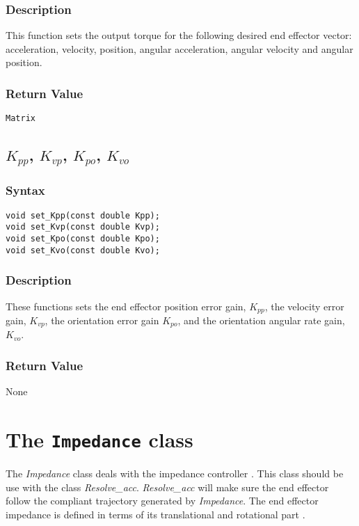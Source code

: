 \documentclass[11pt,fleqn,letterpaper]{report}
\begin{document}
\subsubsection*{Description}   
This function sets the output torque for the following desired end
effector vector: acceleration, velocity, position, angular
acceleration, angular velocity and angular position.
\subsubsection*{Return Value}

\texttt{Matrix}

\newpage

\subsection*{$K_{pp}$, $K_{vp}$, $K_{po}$, $K_{vo}$}
\subsubsection*{Syntax}
\begin{verbatim}
void set_Kpp(const double Kpp);
void set_Kvp(const double Kvp);
void set_Kpo(const double Kpo);
void set_Kvo(const double Kvo);
\end{verbatim}

\subsubsection*{Description}   
These functions sets the end effector position error gain, $K_{pp}$, the velocity
error gain, $K_{vp}$, the orientation error gain $K_{po}$, and the
orientation angular rate gain, $K_{vo}$.
\subsubsection*{Return Value}

None


\newpage

\section{The \texttt{Impedance} class}

The \emph{Impedance} class deals with the impedance controller
\cite{Caccavale99}. This class should be use with the class
\emph{Resolve\_acc}.  \emph{Resolve\_acc} will make sure the end
effector follow the compliant trajectory generated by
\emph{Impedance}. The end effector impedance is defined in terms of
its translational and rotational part \cite{Caccavale99}.
\end{document}
